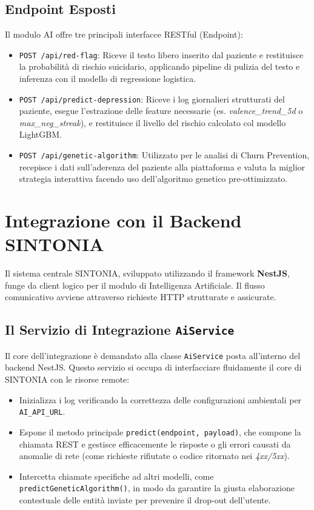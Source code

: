 \subsection{Endpoint Esposti}
Il modulo AI offre tre principali interfacce RESTful (Endpoint):
\begin{itemize}
    \item \texttt{POST /api/red-flag}: Riceve il testo libero inserito dal paziente e restituisce la probabilità di rischio suicidario, applicando pipeline di pulizia del testo e inferenza con il modello di regressione logistica.
    \item \texttt{POST /api/predict-depression}: Riceve i log giornalieri strutturati del paziente, esegue l'estrazione delle feature necessarie (es. \textit{valence\_trend\_5d} o \textit{max\_neg\_streak}), e restituisce il livello del rischio calcolato col modello LightGBM.
    \item \texttt{POST /api/genetic-algorithm}: Utilizzato per le analisi di Churn Prevention, recepisce i dati sull'aderenza del paziente alla piattaforma e valuta la miglior strategia interattiva facendo uso dell'algoritmo genetico pre-ottimizzato.
\end{itemize}

\section{Integrazione con il Backend SINTONIA}
Il sistema centrale SINTONIA, sviluppato utilizzando il framework \textbf{NestJS}, funge da client logico per il modulo di Intelligenza Artificiale. Il flusso comunicativo avviene attraverso richieste HTTP strutturate e assicurate.



\subsection{Il Servizio di Integrazione \texttt{AiService}}
Il core dell'integrazione è demandato alla classe \texttt{AiService} posta all'interno del backend NestJS. Questo servizio si occupa di interfacciare fluidamente il core di SINTONIA con le risorse remote:

\begin{itemize}
    \item Inizializza i log verificando la correttezza delle configurazioni ambientali per \texttt{AI\_API\_URL}.
    \item Espone il metodo principale \texttt{predict(endpoint, payload)}, che compone la chiamata REST e gestisce efficacemente le risposte o gli errori causati da anomalie di rete (come richieste rifiutate o codice ritornato nei \textit{4xx/5xx}).
    \item Intercetta chiamate specifiche ad altri modelli, come \texttt{predictGeneticAlgorithm()}, in modo da garantire la giusta elaborazione contestuale delle entità inviate per prevenire il drop-out dell'utente.
\end{itemize}

